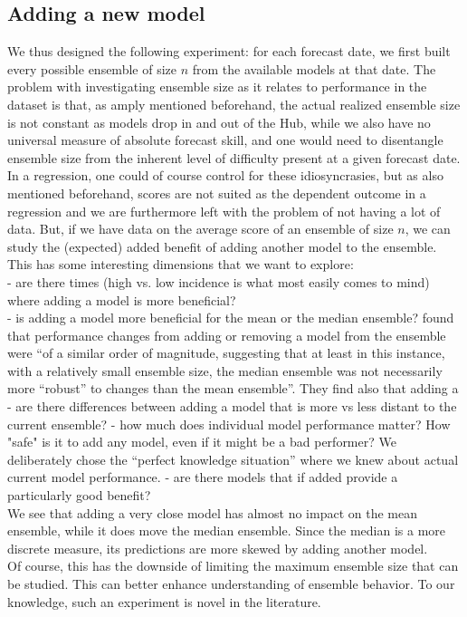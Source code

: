\subsection{Adding a new model} \label{sub:adding_a_new_model}
We thus designed the following experiment: for each forecast date, we first built every possible ensemble of size $n$ from the available models at that date. The problem with investigating ensemble size as it relates to performance in the dataset is that, as amply mentioned beforehand, the actual realized ensemble size is not constant as models drop in and out of the Hub, while we also have no universal measure of absolute forecast skill, and one would need to disentangle ensemble size from the inherent level of difficulty present at a given forecast date. In a regression, one could of course control for these idiosyncrasies, but as also mentioned beforehand, scores are not suited as the dependent outcome in a regression and we are furthermore left with the problem of not having a lot of data. But, if we have data on the average score of an ensemble of size $n$, we can study the (expected) added benefit of adding another model to the ensemble. This has some interesting dimensions that we want to explore:\\
- are there times (high vs. low incidence is what most easily comes to mind) where adding a model is more beneficial?\\
- is adding a model more beneficial for the mean or the median ensemble? \cite{bosse_comparing_2021-1} found that performance changes from adding or removing a model from the ensemble were ``of a similar order of magnitude, suggesting that at least in this instance, with a relatively small ensemble size, the median ensemble was not necessarily more ``robust'' to changes than the mean ensemble''. They find also that adding a 
- are there differences between adding a model that is more vs less distant to the current ensemble?
- how much does individual model performance matter? How "safe" is it to add any model, even if it might be a bad performer? We deliberately chose the ``perfect knowledge situation'' where we knew about actual current model performance. 
- are there models that if added provide a particularly good benefit?\\
We see that adding a very close model has almost no impact on the mean ensemble, while it does move the median ensemble. Since the median is a more discrete measure, its predictions are more skewed by adding another model. \\
Of course, this has the downside of limiting the maximum ensemble size that can be studied. This can better enhance understanding of ensemble behavior. To our knowledge, such an experiment is novel in the literature. 

